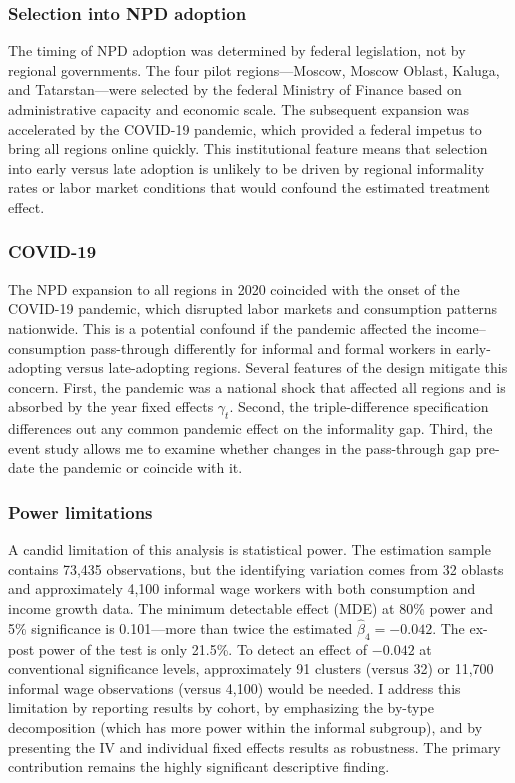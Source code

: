 \documentclass[12pt]{article}
\begin{document}
\subsubsection{Selection into NPD adoption}

The timing of NPD adoption was determined by federal legislation, not by regional governments. The four pilot regions---Moscow, Moscow Oblast, Kaluga, and Tatarstan---were selected by the federal Ministry of Finance based on administrative capacity and economic scale. The subsequent expansion was accelerated by the COVID-19 pandemic, which provided a federal impetus to bring all regions online quickly. This institutional feature means that selection into early versus late adoption is unlikely to be driven by regional informality rates or labor market conditions that would confound the estimated treatment effect.

\subsubsection{COVID-19}

The NPD expansion to all regions in 2020 coincided with the onset of the COVID-19 pandemic, which disrupted labor markets and consumption patterns nationwide. This is a potential confound if the pandemic affected the income--consumption pass-through differently for informal and formal workers in early-adopting versus late-adopting regions. Several features of the design mitigate this concern. First, the pandemic was a national shock that affected all regions and is absorbed by the year fixed effects $\gamma_t$. Second, the triple-difference specification differences out any common pandemic effect on the informality gap. Third, the event study allows me to examine whether changes in the pass-through gap pre-date the pandemic or coincide with it.

\subsubsection{Power limitations}

A candid limitation of this analysis is statistical power. The estimation sample contains 73,435 observations, but the identifying variation comes from 32 oblasts and approximately 4,100 informal wage workers with both consumption and income growth data. The minimum detectable effect (MDE) at 80\% power and 5\% significance is 0.101---more than twice the estimated $\hat{\beta}_4 = -0.042$. The ex-post power of the test is only 21.5\%. To detect an effect of $-0.042$ at conventional significance levels, approximately 91 clusters (versus 32) or 11,700 informal wage observations (versus 4,100) would be needed. I address this limitation by reporting results by cohort, by emphasizing the by-type decomposition (which has more power within the informal subgroup), and by presenting the IV and individual fixed effects results as robustness. The primary contribution remains the highly significant descriptive finding.
\end{document}
